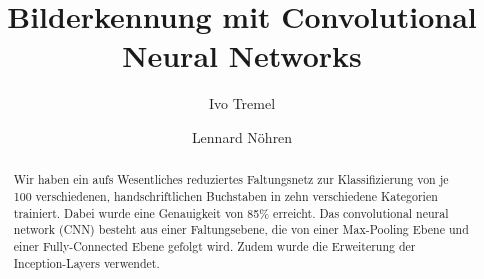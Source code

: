 \documentclass[runningheads,a4paper]{llncs}[2015/06/24]
\begin{document}
\title{Bilderkennung mit Convolutional Neural Networks}

\author{Ivo Tremel \and Lennard Nöhren}

%

			
\maketitle

\begin{abstract}
Wir haben ein aufs Wesentliches reduziertes Faltungsnetz zur Klassifizierung von je 100  verschiedenen, handschriftlichen Buchstaben
in zehn verschiedene Kategorien trainiert. Dabei wurde eine Genauigkeit von 85\% erreicht. Das convolutional neural network (CNN) besteht aus einer Faltungsebene, die von einer Max-Pooling Ebene und einer Fully-Connected Ebene gefolgt wird. Zudem wurde die Erweiterung der Inception-Layers verwendet.
\end{abstract}


\end{document}
